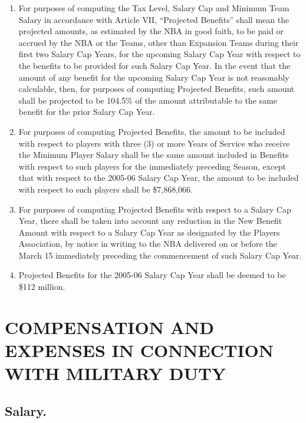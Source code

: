 \documentclass[
]{book}
\providecommand{\tightlist}{%
  \setlength{\itemsep}{0pt}\setlength{\parskip}{0pt}}
\begin{document}
\begin{enumerate}
\def\labelenumi{(\alph{enumi})}
\tightlist
\item
  For purposes of computing the Tax Level, Salary Cap and Minimum Team Salary in accordance with Article VII, ``Projected Benefits'' shall mean the projected amounts, as estimated by the NBA in good faith, to be paid or accrued by the NBA or the Teams, other than Expansion Teams during their first two Salary Cap Years, for the upcoming Salary Cap Year with respect to the benefits to be provided for such Salary Cap Year. In the event that the amount of any benefit for the upcoming Salary Cap Year is not reasonably calculable, then, for purposes of computing Projected Benefits, such amount shall be projected to be 104.5\% of the amount attributable to the same benefit for the prior Salary Cap Year.
\item
  For purposes of computing Projected Benefits, the amount to be included with respect to players with three (3) or more Years of Service who receive the Minimum Player Salary shall be the same amount included in Benefits with respect to such players for the immediately preceding Season, except that with respect to the 2005-06 Salary Cap Year, the amount to be included with respect to such players shall be \$7,868,066.
\item
  For purposes of computing Projected Benefits with respect to a Salary Cap Year, there shall be taken into account any reduction in the New Benefit Amount with respect to a Salary Cap Year as designated by the Players Association, by notice in writing to the NBA delivered on or before the March 15 immediately preceding the commencement of such Salary Cap Year.
\item
  Projected Benefits for the 2005-06 Salary Cap Year shall be deemed to be \$112 million.
\end{enumerate}

\hypertarget{compensation-and-expenses-in-connection-with-military-duty}{%
\chapter{COMPENSATION AND EXPENSES IN CONNECTION WITH MILITARY DUTY}\label{compensation-and-expenses-in-connection-with-military-duty}}


\hypertarget{salary.}{%
\section{Salary.}\label{salary.}}
\end{document}
